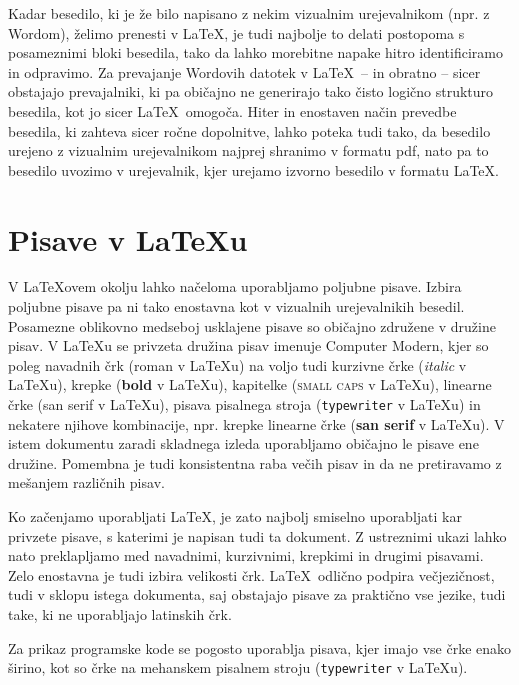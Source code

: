 \documentclass[a4paper,12pt,openright]{book}
\begin{document}
Kadar besedilo, ki je že bilo napisano z nekim vizualnim urejevalnikom (npr. z Wordom), želimo prenesti v \LaTeX, je tudi najbolje to delati postopoma s posameznimi bloki besedila, 
tako da lahko morebitne napake hitro identificiramo in odpravimo.
Za prevajanje Wordovih datotek v \LaTeX\ -- in obratno -- sicer obstajajo prevajalniki, ki pa običajno ne generirajo tako čisto logično strukturo besedila, kot jo sicer \LaTeX\ omogoča.
Hiter in enostaven način prevedbe besedila, ki  zahteva sicer ročne dopolnitve, lahko poteka tudi tako, da besedilo urejeno z vizualnim urejevalnikom najprej shranimo v formatu pdf, 
nato pa to besedilo uvozimo v urejevalnik, kjer urejamo izvorno besedilo v formatu \LaTeX.




\section{Pisave v \LaTeX u}

V  \LaTeX ovem okolju lahko načeloma uporabljamo poljubne pisave. 
Izbira poljubne pisave pa ni tako enostavna kot v vizualnih urejevalnikih besedil.
Posamezne oblikovno medseboj usklajene pisave so običajno združene v družine pisav.
V \LaTeX u se privzeta družina pisav imenuje Computer Modern,
kjer so poleg navadnih črk (roman v \LaTeX u) na voljo tudi kurzivne črke (\textit{italic} v \LaTeX u), 
krepke (\textbf{bold} v \LaTeX u), kapitelke (\textsc{small caps} v \LaTeX u), linearne črke ({\textsf{san serif} v \LaTeX u}), pisava pisalnega stroja (\texttt{typewriter} v \LaTeX u) in nekatere njihove kombinacije, npr. krepke linearne črke 
({\textbf{\textsf{san serif}} v \LaTeX u}).
V istem dokumentu zaradi skladnega izleda uporabljamo običajno le pisave ene družine. 
Pomembna je tudi konsistentna raba večih pisav in da ne pretiravamo z mešanjem različnih pisav.

Ko začenjamo uporabljati \LaTeX, je zato najbolj smiselno uporabljati kar privzete pisave, s katerimi je napisan tudi ta dokument.
Z ustreznimi ukazi  lahko nato preklapljamo med navadnimi, kurzivnimi, krepkimi in drugimi pisavami. 
Zelo enostavna je tudi izbira velikosti črk.
\LaTeX\  odlično podpira večjezičnost, tudi v sklopu istega dokumenta, saj obstajajo pisave za praktično vse jezike, tudi take, ki ne uporabljajo latinskih črk.

Za prikaz programske kode se pogosto uporablja pisava, kjer imajo vse črke enako širino, kot so  črke na mehanskem pisalnem stroju ({\texttt{typewriter} v \LaTeX u}).
\end{document}
